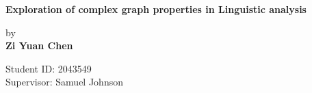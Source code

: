\begin{titlepage}
    \begin{center}
        \vspace*{2cm}
        
        \Huge
        \textbf{Exploration of complex graph properties in Linguistic analysis}
        
        \vspace{0.5cm}
        \LARGE
        by\\
    
        \textbf{Zi Yuan Chen}
        
        \vspace{1.0cm}
        \large
        Student ID: 2043549\\
        Supervisor: Samuel Johnson
        \begin{flushleft}
        \end{flushleft}
        
    \end{center}
    
\end{titlepage}